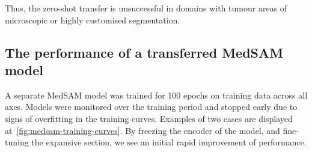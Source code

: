 \documentclass[12pt,twoside]{report}
\begin{document}
\begin{table}[h!]
  \centering
  \caption{Duplicate table from the Appendix Figure~\ref{tab:medsam-hd}: Haussdorf Distance across each anatomy. In bold are the anatomies where the MedSAM model has performed better than the baseline.}
  \label{tab:medsam-hd-duplicate}
\end{table}

Thus, the zero-shot transfer is unsuccessful in domains with tumour areas of microscopic or highly customised segmentation. 

\subsection{The performance of a transferred MedSAM model}

A separate MedSAM model was trained for 100 epochs on training data across all axes. Models were monitored over the training period and stopped early due to signs of overfitting in the training curves. Examples of two cases are displayed at~\ref{fig:medsam-training-curves}. By freezing the encoder of the model, and fine-tuning the expansive section, we see an initial rapid improvement of performance.
\end{document}
